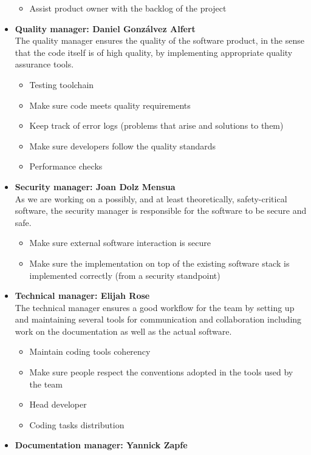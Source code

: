 \begin{itemize}
\begin{itemize}
			\item Assist product owner with the backlog of the project
		\end{itemize}
	\item \textbf{Quality manager: Daniel Gonzálvez Alfert} \\
		The quality manager ensures the quality of the software product, in the sense that the code itself is of high quality, by implementing appropriate quality assurance tools.
		\begin{itemize}
			\item Testing toolchain
			\item Make sure code meets quality requirements
			\item Keep track of error logs (problems that arise and solutions to them)
			\item Make sure developers follow the quality standards
			\item Performance checks
		\end{itemize}
	\item \textbf{Security manager: Joan Dolz Mensua} \\
		As we are working on a possibly, and at least theoretically, safety-critical software, the security manager is responsible for the software to be secure and safe.
		\begin{itemize}
			\item Make sure external software interaction is secure
			\item Make sure the implementation on top of the existing software stack is implemented correctly (from a security standpoint)
		\end{itemize}
	\item \textbf{Technical manager: Elijah Rose} \\
		The technical manager ensures a good workflow for the team by setting up and maintaining several tools for communication and collaboration including work on the documentation as well as the actual software.
		\begin{itemize}
			\item Maintain coding tools coherency
			\item Make sure people respect the conventions adopted in the tools used by the team
			\item Head developer
			\item Coding tasks distribution
		\end{itemize}
	\item \textbf{Documentation manager: Yannick Zapfe} \\

\end{itemize}
